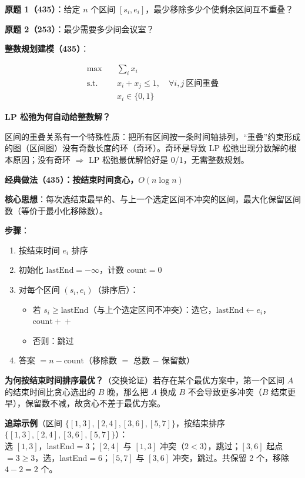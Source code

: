 \documentclass[12pt, a4paper]{ctexart}
\begin{document}
\begin{blackboard}

\textbf{原题 1（435）}：给定 $n$ 个区间 $[s_i, e_i]$，最少移除多少个使剩余区间互不重叠？

\textbf{原题 2（253）}：最少需要多少间会议室？

\textbf{整数规划建模（435）}：

\begin{align}
\max \quad & \sum_i x_i \\
\text{s.t.} \quad & x_i + x_j \leq 1, \quad \forall i,j\ \text{区间重叠} \\
& x_i \in \{0, 1\}
\end{align}

\textbf{LP 松弛为何自动给整数解？}

区间的重叠关系有一个特殊性质：把所有区间按一条时间轴排列，``重叠''约束形成的图（区间图）没有奇数长度的环（奇环）。奇环是导致 LP 松弛出现分数解的根本原因；没有奇环 $\Rightarrow$ LP 松弛最优解恰好是 0/1，无需整数规划。

\textbf{经典做法（435）：按结束时间贪心，$O(n\log n)$}

\textbf{核心思想}：每次选结束最早的、与上一个选定区间不冲突的区间，最大化保留区间数（等价于最小化移除数）。

\textbf{步骤}：
\begin{enumerate}
    \item 按结束时间 $e_i$ 排序
    \item 初始化 $\text{lastEnd} = -\infty$，计数 $\text{count}=0$
    \item 对每个区间 $(s_i, e_i)$（排序后）：
        \begin{itemize}
            \item 若 $s_i \geq \text{lastEnd}$（与上个选定区间不冲突）：选它，$\text{lastEnd} \leftarrow e_i$，$\text{count}+\!\!+$
            \item 否则：跳过
        \end{itemize}
    \item 答案 $= n - \text{count}$（移除数 $=$ 总数 $-$ 保留数）
\end{enumerate}

\textbf{为何按结束时间排序最优？}（交换论证）若存在某个最优方案中，第一个区间 $A$ 的结束时间比贪心选出的 $B$ 晚，那么把 $A$ 换成 $B$ 不会导致更多冲突（$B$ 结束更早），保留数不减，故贪心不差于最优方案。

\textbf{追踪示例}（区间 $\{[1,3],[2,4],[3,6],[5,7]\}$，按结束排序 $\{[1,3],[2,4],[3,6],[5,7]\}$）：\\
选 $[1,3]$，lastEnd$=3$；$[2,4]$ 与 $[1,3]$ 冲突（$2<3$），跳过；$[3,6]$ 起点$=3\geq 3$，选，lastEnd$=6$；$[5,7]$ 与 $[3,6]$ 冲突，跳过。共保留 2 个，移除 $4-2=2$ 个。


\end{blackboard}
\end{document}
